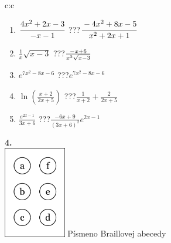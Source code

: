 \documentclass[10pt]{report}
\begin{document}
\begin{tabular}{c:c}
\begin{minipage}[c][104.5mm][t]{0.5\linewidth}
\begin{center}
\begin{minipage}{0.79\linewidth}
\begin{center}
\begin{varwidth}{\linewidth}
\begin{enumerate}
\item $\cfrac{4x^2+2x-3}{-x-1}$\quad \dotfill\; ???\;\dotfill \quad $\cfrac{-4x^2+8x-5}{x^2+2x+1}$
\item $\frac{1}{x}\sqrt{x-3}$\quad \dotfill\; ???\;\dotfill \quad $\frac{-x+6}{x^2 \sqrt{\smash[b]{x-3}}}$
\item $e^{7x^2-8x-6}$\quad \dotfill\; ???\;\dotfill \quad $e^{7x^2-8x-6}$
\item $\ln{\left(\frac{x+2}{2x+5}\right)}$\quad \dotfill\; ???\;\dotfill \quad $\frac{1}{x+2}+\frac{2}{2x+5}$
\item $\frac{e^{2x-1}}{3x+6}$\quad \dotfill\; ???\;\dotfill \quad $\frac{-6x+9}{(3x+6)^2}e^{2x-1}$
\end{enumerate}
\end{varwidth}
\end{center}
\end{minipage}
\begin{minipage}{0.20\linewidth}
\begin{center}
{\Huge\bfseries 4.} \\[2mm]
\includegraphics[height=40mm]{../images/braille.png}
{\small Písmeno Braillovej abecedy}
\end{center}
\end{minipage}
\end{center}
\end{minipage}
%
\end{tabular}
\newpage
\thispagestyle{empty}
\end{document}

